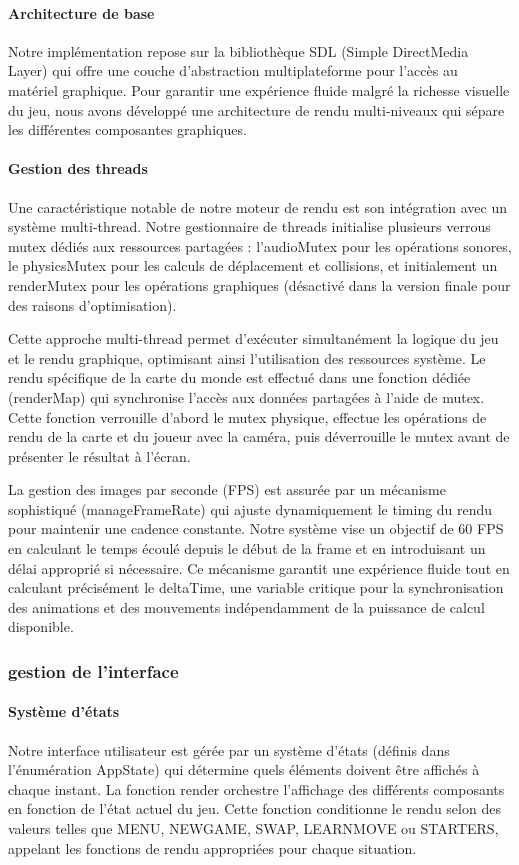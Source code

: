 \documentclass[12pt,a4paper, twoside]{article}
\begin{document}
\paragraph{Architecture de base} Notre implémentation repose sur la bibliothèque SDL (Simple DirectMedia Layer) qui offre une couche d'abstraction multiplateforme pour l'accès au matériel graphique. Pour garantir une expérience fluide malgré la richesse visuelle du jeu, nous avons développé une architecture de rendu multi-niveaux qui sépare les différentes composantes graphiques.

\paragraph{Gestion des threads} Une caractéristique notable de notre moteur de rendu est son intégration avec un système multi-thread. Notre gestionnaire de threads initialise plusieurs verrous mutex dédiés aux ressources partagées : l'audioMutex pour les opérations sonores, le physicsMutex pour les calculs de déplacement et collisions, et initialement un renderMutex pour les opérations graphiques (désactivé dans la version finale pour des raisons d'optimisation).

Cette approche multi-thread permet d'exécuter simultanément la logique du jeu et le rendu graphique, optimisant ainsi l'utilisation des ressources système. Le rendu spécifique de la carte du monde est effectué dans une fonction dédiée (renderMap) qui synchronise l'accès aux données partagées à l'aide de mutex. Cette fonction verrouille d'abord le mutex physique, effectue les opérations de rendu de la carte et du joueur avec la caméra, puis déverrouille le mutex avant de présenter le résultat à l'écran.

La gestion des images par seconde (FPS) est assurée par un mécanisme sophistiqué (manageFrameRate) qui ajuste dynamiquement le timing du rendu pour maintenir une cadence constante. Notre système vise un objectif de 60 FPS en calculant le temps écoulé depuis le début de la frame et en introduisant un délai approprié si nécessaire. Ce mécanisme garantit une expérience fluide tout en calculant précisément le deltaTime, une variable critique pour la synchronisation des animations et des mouvements indépendamment de la puissance de calcul disponible.

\subsubsection{gestion de l'interface}
\paragraph{Système d'états} Notre interface utilisateur est gérée par un système d'états (définis dans l'énumération AppState) qui détermine quels éléments doivent être affichés à chaque instant. La fonction render orchestre l'affichage des différents composants en fonction de l'état actuel du jeu. Cette fonction conditionne le rendu selon des valeurs telles que MENU, NEWGAME, SWAP, LEARNMOVE ou STARTERS, appelant les fonctions de rendu appropriées pour chaque situation.
\end{document}

